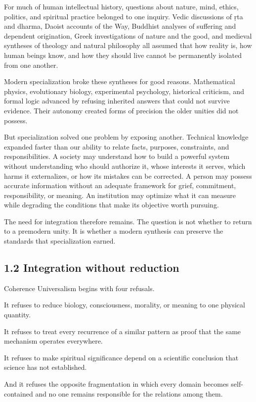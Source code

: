 \documentclass[
  11pt,
]{article}
\begin{document}
For much of human intellectual history, questions about nature, mind,
ethics, politics, and spiritual practice belonged to one inquiry. Vedic
discussions of ṛta and dharma, Daoist accounts of the Way, Buddhist
analyses of suffering and dependent origination, Greek investigations of
nature and the good, and medieval syntheses of theology and natural
philosophy all assumed that how reality is, how human beings know, and
how they should live cannot be permanently isolated from one another.

Modern specialization broke these syntheses for good reasons.
Mathematical physics, evolutionary biology, experimental psychology,
historical criticism, and formal logic advanced by refusing inherited
answers that could not survive evidence. Their autonomy created forms of
precision the older unities did not possess.

But specialization solved one problem by exposing another. Technical
knowledge expanded faster than our ability to relate facts, purposes,
constraints, and responsibilities. A society may understand how to build
a powerful system without understanding who should authorize it, whose
interests it serves, which harms it externalizes, or how its mistakes
can be corrected. A person may possess accurate information without an
adequate framework for grief, commitment, responsibility, or meaning. An
institution may optimize what it can measure while degrading the
conditions that make its objective worth pursuing.

The need for integration therefore remains. The question is not whether
to return to a premodern unity. It is whether a modern synthesis can
preserve the standards that specialization earned.

\subsection{1.2 Integration without
reduction}\label{integration-without-reduction}

Coherence Universalism begins with four refusals.

It refuses to reduce biology, consciousness, morality, or meaning to one
physical quantity.

It refuses to treat every recurrence of a similar pattern as proof that
the same mechanism operates everywhere.

It refuses to make spiritual significance depend on a scientific
conclusion that science has not established.

And it refuses the opposite fragmentation in which every domain becomes
self-contained and no one remains responsible for the relations among
them.
\end{document}
